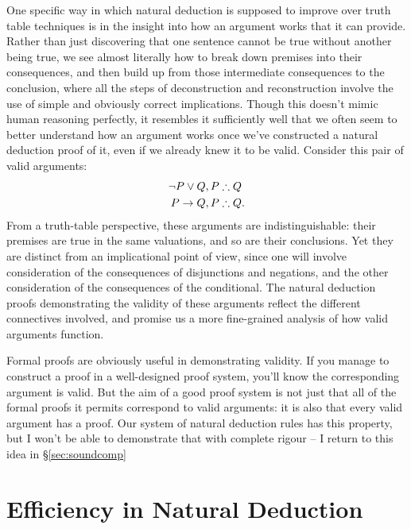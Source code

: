 One specific way in which natural deduction is supposed to improve over truth table techniques is in the insight into how an argument works that it can provide. Rather than just discovering that one sentence cannot be true without another being true, we see almost literally how to break down premises into their consequences, and then build up from those intermediate consequences to the conclusion, where all the steps of deconstruction and reconstruction involve the use of simple and obviously correct implications. Though this doesn't mimic human reasoning perfectly, it resembles it sufficiently well that we often seem to better understand how an argument works once we've constructed a natural deduction proof of it, even if we already knew it to be valid.  Consider this pair of valid arguments:
	\begin{align*}
		\neg P \vee Q,  P & \mathrel{\therefore} Q\\
		P \rightarrow Q, P & \mathrel{\therefore} Q.
	\end{align*} 
From a truth-table perspective, these arguments are indistinguishable: their premises are true in the same valuations, and so are their conclusions. Yet they are distinct from an implicational point of view, since one will involve consideration of the consequences of disjunctions and negations, and the other consideration of the consequences of the conditional. The natural deduction proofs demonstrating the validity of these arguments reflect the different connectives involved, and promise us a more fine-grained analysis of how valid arguments function.

Formal proofs are obviously useful in demonstrating validity. If you manage to construct a proof in a well-designed proof system, you'll know the corresponding argument is valid. But the aim of a good proof system is not just that all of the formal proofs it permits correspond to valid arguments: it is also that every valid argument has a proof. Our system of natural deduction rules has this property, but I won't be able to demonstrate that with complete rigour – I return to this idea in §\ref{sec:soundcomp}


\section{Efficiency in Natural Deduction} %
\label{sec:efficiency_in_natural_deduction}


